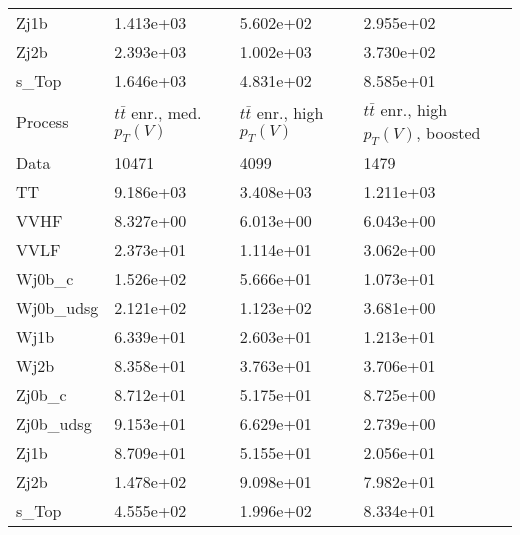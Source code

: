 \begin{table}
{\begin{tabularx}{0.8\textwidth}{|X|X|X|X|}
Zj1b & 1.413e+03 & 5.602e+02 & 2.955e+02 \\
Zj2b & 2.393e+03 & 1.002e+03 & 3.730e+02 \\
s\_Top & 1.646e+03 & 4.831e+02 & 8.585e+01 \\
\hline
\hline
Process & $t\bar{t}$ enr., med. $p_{T}(V)$ & $t\bar{t}$ enr., high $p_{T}(V)$ & $t\bar{t}$ enr., high $p_{T}(V)$, boosted \\
\hline
Data & 10471 & 4099 & 1479 \\
\hline
TT & 9.186e+03 & 3.408e+03 & 1.211e+03 \\
VVHF & 8.327e+00 & 6.013e+00 & 6.043e+00 \\
VVLF & 2.373e+01 & 1.114e+01 & 3.062e+00 \\
Wj0b\_c & 1.526e+02 & 5.666e+01 & 1.073e+01 \\
Wj0b\_udsg & 2.121e+02 & 1.123e+02 & 3.681e+00 \\
Wj1b & 6.339e+01 & 2.603e+01 & 1.213e+01 \\
Wj2b & 8.358e+01 & 3.763e+01 & 3.706e+01 \\
Zj0b\_c & 8.712e+01 & 5.175e+01 & 8.725e+00 \\
Zj0b\_udsg & 9.153e+01 & 6.629e+01 & 2.739e+00 \\
Zj1b & 8.709e+01 & 5.155e+01 & 2.056e+01 \\
Zj2b & 1.478e+02 & 9.098e+01 & 7.982e+01 \\
s\_Top & 4.555e+02 & 1.996e+02 & 8.334e+01 \\
\hline
\end{tabularx}
}
\label{tab:cr-Znn-2018}
\end{table}


